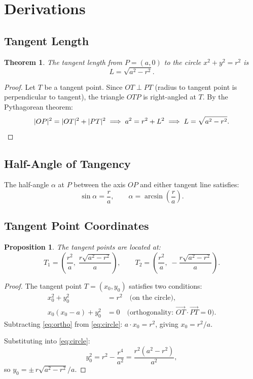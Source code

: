 \documentclass[11pt,a4paper]{article}
\newtheorem{theorem}{Theorem}
\newtheorem{proposition}{Proposition}
\begin{document}
\section{Derivations}

\subsection{Tangent Length}

\begin{theorem}
The tangent length from $P = (a, 0)$ to the circle $x^2 + y^2 = r^2$ is
\[
    L = \sqrt{a^2 - r^2}.
\]
\end{theorem}

\begin{proof}
Let $T$ be a tangent point. Since $OT \perp PT$ (radius to tangent point is perpendicular to tangent), the triangle $OTP$ is right-angled at $T$. By the Pythagorean theorem:
\[
    |OP|^2 = |OT|^2 + |PT|^2 \implies a^2 = r^2 + L^2 \implies L = \sqrt{a^2 - r^2}. \qedhere
\]
\end{proof}

\subsection{Half-Angle of Tangency}

The half-angle $\alpha$ at $P$ between the axis $OP$ and either tangent line satisfies:
\[
    \sin\alpha = \frac{r}{a}, \qquad \alpha = \arcsin\!\left(\frac{r}{a}\right).
\]

\subsection{Tangent Point Coordinates}

\begin{proposition}
The tangent points are located at:
\[
    T_1 = \left(\frac{r^2}{a},\; \frac{r\sqrt{a^2 - r^2}}{a}\right), \qquad
    T_2 = \left(\frac{r^2}{a},\; -\frac{r\sqrt{a^2 - r^2}}{a}\right).
\]
\end{proposition}

\begin{proof}
The tangent point $T = (x_0, y_0)$ satisfies two conditions:
\begin{align}
    x_0^2 + y_0^2 &= r^2 \quad \text{(on the circle)}, \label{eq:circle}\\
    x_0(x_0 - a) + y_0^2 &= 0 \quad \text{(orthogonality: } \vec{OT} \cdot \vec{PT} = 0\text{)}. \label{eq:ortho}
\end{align}
Subtracting \eqref{eq:ortho} from \eqref{eq:circle}: $a \cdot x_0 = r^2$, giving $x_0 = r^2/a$.

Substituting into \eqref{eq:circle}:
\[
    y_0^2 = r^2 - \frac{r^4}{a^2} = \frac{r^2(a^2 - r^2)}{a^2},
\]
so $y_0 = \pm\, r\sqrt{a^2 - r^2}/a$.
\end{proof}
\end{document}

